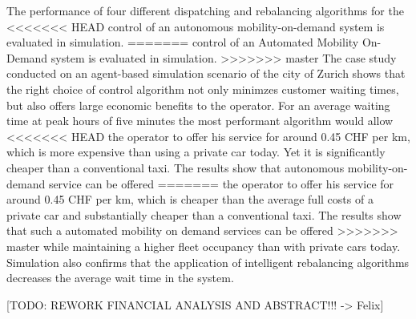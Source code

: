 The performance of four different dispatching and rebalancing algorithms for the
<<<<<<< HEAD
control of an autonomous mobility-on-demand system is evaluated in simulation.
=======
control of an Automated Mobility On-Demand system is evaluated in simulation.
>>>>>>> master
The case study conducted on an agent-based simulation scenario of the city of Zurich
shows that the right choice of control algorithm not only minimzes customer waiting
times, but also offers large economic benefits to the operator. For an average
waiting time at peak hours of five minutes the most performant algorithm would allow
<<<<<<< HEAD
the operator to offer his service for around 0.45 CHF per km, which is more expensive
than using a private car today. Yet it is significantly cheaper than a conventional
taxi. The results show that autonomous mobility-on-demand service can be offered
=======
the operator to offer his service for around 0.45 CHF per km, which is cheaper than
the average full costs of a private car and substantially cheaper than a conventional
taxi. The results show that such a automated mobility on demand services can be offered
>>>>>>> master
while maintaining a higher fleet occupancy than with private cars today. Simulation
also confirms that the application of intelligent rebalancing algorithms decreases
the average wait time in the system.

[TODO: REWORK FINANCIAL ANALYSIS AND ABSTRACT!!! -> Felix]
